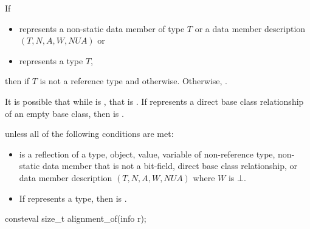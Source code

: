 \begin{itemdescr}
\pnum
\returns
If
\begin{itemize}
\item {} represents a non-static data member of type $T$ or
a data member description $(T, N, A, W, \mathit{NUA})$ or
\item {} represents a type $T$,
\end{itemize}
then  if $T$ is not a reference type
and  otherwise.
Otherwise, .
\begin{note}
It is possible that while 
is ,
that 
is .
If  represents a direct base class relationship of an empty base class,
then  is .
\end{note}

\pnum
\throws
{} unless
all of the following conditions are met:
\begin{itemize}
\item
{} is a reflection of a
type,
object,
value,
variable of non-reference type,
non-static data member that is not a bit-field,
direct base class relationship, or
data member description $(T, N, A, W, \mathit{NUA})$
where $W$ is $\bot$.
\item
If  represents a type,
then  is .
\end{itemize}
\end{itemdescr}

%
\begin{itemdecl}
consteval size_t alignment_of(info r);
\end{itemdecl}

